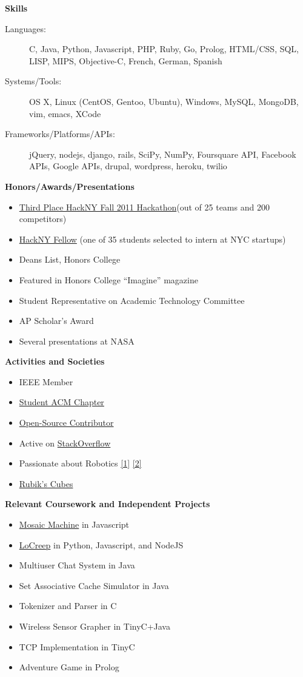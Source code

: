\documentclass[letterpaper,11pt]{article}
\newcommand{\resitem}[1]{\item #1 \vspace{-2pt}}
\newcommand{\resheading}[1]{{\large \colorbox{mygrey}{\begin{minipage}{\textwidth}{\textbf{#1 \vphantom{p\^{E}}}}\end{minipage}}}}
\begin{document}
\pagebreak
\resheading{Skills}
\begin{description}
\item[Languages:]
C, Java, Python, Javascript, PHP, Ruby, Go, Prolog, HTML/CSS, SQL, LISP, MIPS, Objective-C, French, German, Spanish
\item[Systems/Tools:]
OS X, Linux (CentOS, Gentoo, Ubuntu), Windows, MySQL, MongoDB, vim, emacs, XCode
\item[Frameworks/Platforms/APIs:]
jQuery, nodejs, django, rails, SciPy, NumPy, Foursquare API, Facebook APIs, Google APIs, drupal, wordpress, heroku, twilio 
\end{description}

\resheading{Honors/Awards/Presentations}
\begin{itemize}
   \resitem{\href{http://www.youtube.com/watch?v=ga6RPRAFRUY}{Third Place HackNY Fall 2011 Hackathon}(out of 25 teams and 200 competitors)}
   \resitem{\href{http://hackny.org/a/about/}{HackNY Fellow} (one of 35 students selected to intern at NYC startups)}
   \resitem{Deans List, Honors College}
   \resitem{Featured in Honors College ``Imagine'' magazine}
   \resitem{Student Representative on Academic Technology Committee}
   \resitem{AP Scholar's Award}
   \resitem{Several presentations at NASA}
\end{itemize}
\resheading{Activities and Societies}
\begin{itemize}
   \resitem{IEEE Member}
   \resitem{\href{http://polaris.cs.wcu.edu/~acm/}{Student ACM Chapter}}
   \resitem{\href{https://github.com/ranman}{Open-Source Contributor}}
   \resitem{Active on \href{http://stackoverflow.com/users/240004/ranman}{StackOverflow}}
   \resitem{Passionate about Robotics
      \href{http://robotics.punahou.edu/}{[1]}
      \href{http://irg.arc.nasa.gov}{[2]}}
   \resitem{\href{http://www.youtube.com/user/ranman96734}{Rubik's Cubes}}
\end{itemize}
\resheading{Relevant Coursework and Independent Projects}
\begin{itemize}
   \resitem{\href{http://www.mosaicmachine.com/}{Mosaic Machine} in Javascript}
   \resitem{\href{http://www.locreep.com/}{LoCreep} in Python, Javascript, and NodeJS}
   \resitem{Multiuser Chat System in Java}
   \resitem{Set Associative Cache Simulator in Java}
   \resitem{Tokenizer and Parser in C}
   \resitem{Wireless Sensor Grapher in TinyC+Java}
   \resitem{TCP Implementation in TinyC}
   \resitem{Adventure Game in Prolog}
\end{itemize}
\end{document}
